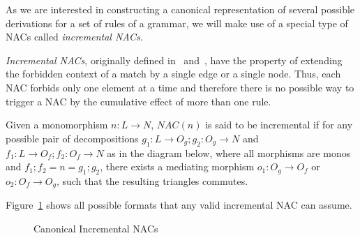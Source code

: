 As we are interested in constructing a canonical representation of several possible derivations for a set of rules of a grammar, we will make use of a special type of NACs called \emph{incremental NACs}.

\emph{Incremental NACs}, originally defined in~\cite{Corradini2013} and~\cite{Corradini2014}, have the property of extending the forbidden context of a match by a single edge or a single node. Thus, each NAC forbids only one element at a time and therefore there is no possible way to trigger a NAC by the cumulative effect of more than one rule.

\begin{definition} Given a monomorphism \mbox{$n : L \rightarrow N$}, $NAC(n)$ is said to be incremental if for any possible pair of decompositions \mbox{$g_1 : L \rightarrow O_g;g_2 : O_g \rightarrow N$} and \mbox{$f_1 : L \rightarrow O_f;f_2 : O_f \rightarrow N$} as in the diagram below, where all morphisms are monos and \mbox{$f_1;f_2 = n = g_1;g_2$}, there exists a mediating morphism $o_1 : O_g \rightarrow O_f$ or $o_2 : O_f \rightarrow O_g$, such that the resulting triangles
  commutes.


\end{definition}

\begin{example}Figure~\ref{fig:process:incremental-nacs} shows all possible formats that any valid incremental NAC can assume.

\begin{figure}[!ht]
  \centering
  \caption{Canonical Incremental NACs}\label{fig:process:incremental-nacs}
\end{figure}
\end{example}

